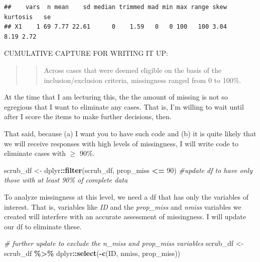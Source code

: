 \documentclass[
  11pt,
]{book}
\newenvironment{Shaded}{\begin{snugshade}}{\end{snugshade}}
\newcommand{\CommentTok}[1]{\textcolor[rgb]{0.37,0.37,0.37}{\textit{#1}}}
\newcommand{\DecValTok}[1]{\textcolor[rgb]{0.06,0.06,0.06}{#1}}
\newcommand{\FunctionTok}[1]{\textcolor[rgb]{0.27,0.27,0.27}{\textbf{#1}}}
\newcommand{\NormalTok}[1]{#1}
\newcommand{\OtherTok}[1]{\textcolor[rgb]{0.37,0.37,0.37}{#1}}
\newcommand{\SpecialCharTok}[1]{\textcolor[rgb]{0.43,0.43,0.43}{\textbf{#1}}}
\begin{document}
\begin{verbatim}
##    vars  n mean    sd median trimmed mad min max range skew kurtosis   se
## X1    1 69 7.77 22.61      0    1.59   0   0 100   100 3.04     8.19 2.72
\end{verbatim}

CUMULATIVE CAPTURE FOR WRITING IT UP:

\begin{quote}
\begin{quote}
Across cases that were deemed eligible on the basis of the inclusion/exclusion criteria, missingness ranged from 0 to 100\%.
\end{quote}
\end{quote}

At the time that I am lecturing this, the the amount of missing is not so egregious that I want to eliminate any cases. That is, I'm willing to wait until after I score the items to make further decisions, then.

That said, because (a) I want you to have such code and (b) it is quite likely that we will receive responses with high levels of missingness, I will write code to eliminate cases with \(\geq\) 90\%.

\begin{Shaded}
\begin{Highlighting}[]
\NormalTok{scrub\_df }\OtherTok{\textless{}{-}}\NormalTok{ dplyr}\SpecialCharTok{::}\FunctionTok{filter}\NormalTok{(scrub\_df, prop\_miss }\SpecialCharTok{\textless{}=} \DecValTok{90}\NormalTok{)  }\CommentTok{\#update df to have only those with at least 90\% of complete data}
\end{Highlighting}
\end{Shaded}

To analyze missingness at this level, we need a df that has only the variables of interest. That is, variables like \emph{ID} and the \emph{prop\_miss} and \emph{nmiss} variables we created will interfere with an accurate assessment of missingness. I will update our df to eliminate these.

\begin{Shaded}
\begin{Highlighting}[]
\CommentTok{\# further update to exclude the n\_miss and prop\_miss variables}
\NormalTok{scrub\_df }\OtherTok{\textless{}{-}}\NormalTok{ scrub\_df }\SpecialCharTok{\%\textgreater{}\%}
\NormalTok{    dplyr}\SpecialCharTok{::}\FunctionTok{select}\NormalTok{(}\SpecialCharTok{{-}}\FunctionTok{c}\NormalTok{(ID, nmiss, prop\_miss))}
\end{Highlighting}
\end{Shaded}
\end{document}
